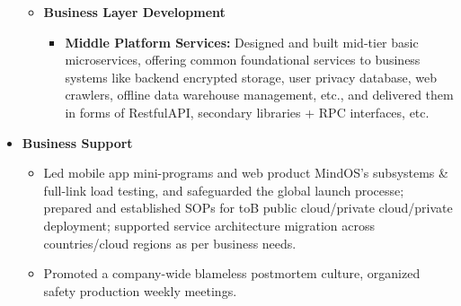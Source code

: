 \documentclass[letterpaper,11pt]{article}
\begin{document}
\begin{spacing}{0.9}
\begin{itemize}
\begin{itemize}
			\item \textbf{Business Layer Development}
			\begin{itemize}
				\item \textbf{Middle Platform Services: }Designed and built mid-tier basic microservices, offering common foundational services to business systems like backend encrypted storage, user privacy database,
				web crawlers, offline data warehouse management, etc., and delivered them in forms of RestfulAPI, secondary libraries + RPC interfaces, etc.
			\end{itemize}
		\end{itemize}
		\item \textbf{Business Support}
		\begin{itemize}
			\item Led mobile app mini-programs and web product MindOS’s subsystems \& full-link load testing, and safeguarded the global launch processe; prepared and established SOPs for toB public cloud/private cloud/private deployment; supported service architecture migration across countries/cloud regions as per business needs.
			\item Promoted a company-wide blameless postmortem culture, organized safety production weekly meetings.
		\end{itemize}
	\end{itemize}
	

\end{spacing}
\end{document}
